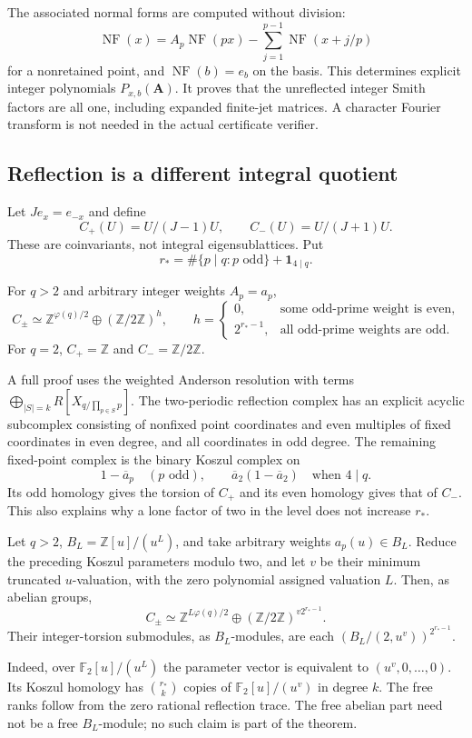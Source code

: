 The associated normal forms are computed without division:
\[
 \operatorname{NF}(x)=A_p\operatorname{NF}(px)
       -\sum_{j=1}^{p-1}\operatorname{NF}(x+j/p)
\]
for a nonretained point, and $\operatorname{NF}(b)=e_b$ on the basis.
This determines explicit integer polynomials $P_{x,b}(\boldsymbol A)$.
It proves that the unreflected integer Smith factors are all one,
including expanded finite-jet matrices. A character Fourier transform
is not needed in the actual certificate verifier.

\subsection{Reflection is a different integral quotient}
Let $J e_x=e_{-x}$ and define
\[
 C_+(U)=U/(J-1)U,\qquad C_-(U)=U/(J+1)U.
\]
These are coinvariants, not integral eigensublattices. Put
\[
 r_* = \#\{p\mid q:p\text{ odd}\}+\boldsymbol1_{4\mid q}.
\]
\begin{theorem}
\label{intdist:thm:scalar}
For $q>2$ and arbitrary integer weights $A_p=a_p$,
\[
 C_\pm\simeq\mathbb Z^{\varphi(q)/2}\oplus(\mathbb Z/2\mathbb Z)^h,
 \qquad
 h=\begin{cases}
 0,&\text{some odd-prime weight is even},\\
 2^{r_*-1},&\text{all odd-prime weights are odd}.
 \end{cases}
\]
For $q=2$, $C_+=\mathbb Z$ and $C_-=\mathbb Z/2\mathbb Z$.
\end{theorem}

A full proof uses the weighted Anderson resolution with terms
$\bigoplus_{|S|=k}R[X_{q/\prod_{p\in S}p}]$.
The two-periodic reflection complex has an explicit acyclic subcomplex
consisting of nonfixed point coordinates and even multiples of fixed
coordinates in even degree, and all coordinates in odd degree.
The remaining fixed-point complex is the binary Koszul complex on
\[
 1-\overline a_p\quad(p\text{ odd}),\qquad
 \overline a_2(1-\overline a_2)\quad\text{when }4\mid q.
\]
Its odd homology gives the torsion of $C_+$ and its even homology gives
that of $C_-$. This also explains why a lone factor of two in the level
does not increase $r_*$.

\begin{theorem}
\label{intdist:thm:jets}
Let $q>2$, $B_L=\mathbb Z[u]/(u^L)$, and take arbitrary weights
$a_p(u)\in B_L$. Reduce the preceding Koszul parameters modulo two,
and let $v$ be their minimum truncated $u$-valuation, with the zero
polynomial assigned valuation $L$. Then, as abelian groups,
\[
 C_\pm\simeq\mathbb Z^{L\varphi(q)/2}
       \oplus(\mathbb Z/2\mathbb Z)^{v2^{r_*-1}}.
\]
Their integer-torsion submodules, as $B_L$-modules, are each
$(B_L/(2,u^v))^{2^{r_*-1}}$.
\end{theorem}
Indeed, over $\mathbb F_2[u]/(u^L)$ the parameter vector is equivalent
to $(u^v,0,\ldots,0)$. Its Koszul homology has
$\binom{r_*}{k}$ copies of $\mathbb F_2[u]/(u^v)$ in degree $k$.
The free ranks follow from the zero rational reflection trace.
The free abelian part need not be a free $B_L$-module; no such claim
is part of the theorem.

